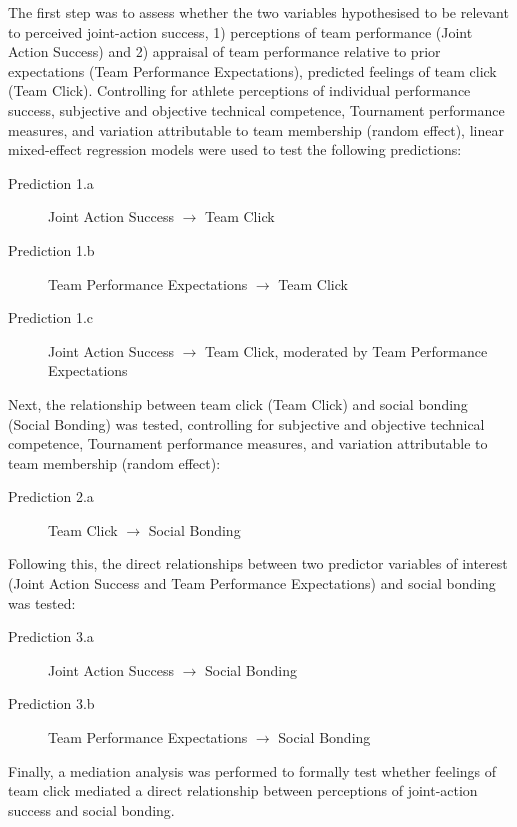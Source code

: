 The first step was to assess whether the two variables hypothesised to be relevant to perceived joint-action success, 1) perceptions of team performance (Joint Action Success) and 2) appraisal of team performance relative to prior expectations (Team Performance Expectations), predicted feelings of team click (Team Click). Controlling for athlete perceptions of individual performance success, subjective and objective technical competence, Tournament performance measures, and variation attributable to team membership (random effect), linear mixed-effect regression models were used to test the following predictions:

\begin{description}
  \item [Prediction 1.a] Joint Action Success  $\rightarrow$ Team Click
  \item [Prediction 1.b] Team Performance Expectations $\rightarrow$ Team Click
  \item [Prediction 1.c] Joint Action Success $\rightarrow$ Team Click, moderated by Team Performance Expectations
\end{description}

Next, the relationship between team click (Team Click) and social bonding (Social Bonding) was tested, controlling for subjective and objective technical competence, Tournament performance measures, and variation attributable to team membership (random effect):

\begin{description}
  \item [Prediction 2.a] Team Click $\rightarrow$ Social Bonding
\end{description}

Following this, the direct relationships between two predictor variables of interest (Joint Action Success and Team Performance Expectations) and social bonding was tested:

\begin{description}
  \item [Prediction 3.a] Joint Action Success $\rightarrow$ Social Bonding
  \item [Prediction 3.b] Team Performance Expectations $\rightarrow$ Social Bonding
\end{description}

Finally, a mediation analysis was performed to formally test whether feelings of team click mediated a direct relationship between perceptions of joint-action success and social bonding.

